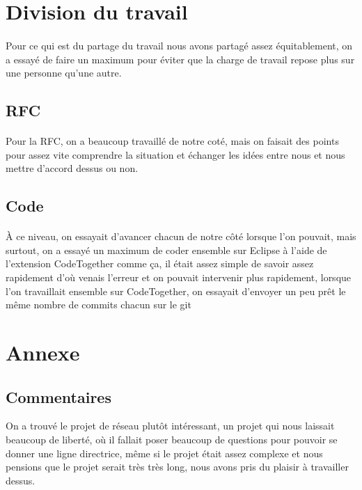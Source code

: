 \documentclass[a4paper,titlepage]{report}
\begin{document}
\section{Division du travail}
\paragraph{}
Pour ce qui est du partage du travail nous avons partagé assez équitablement, on a essayé de faire un maximum pour éviter que la charge de travail repose plus sur une personne qu'une autre.
\subsection{RFC}
\paragraph{}
Pour la RFC, on a beaucoup travaillé de notre coté, mais on faisait des points pour assez vite comprendre la situation et échanger les idées entre nous et nous mettre d'accord dessus ou non.
\subsection{Code}
\paragraph{}
À ce niveau, on essayait d'avancer chacun de notre côté lorsque l'on pouvait, mais surtout, on a essayé un maximum de coder ensemble sur Eclipse à l'aide de l'extension CodeTogether comme ça, il était assez simple de savoir assez rapidement d'où venais l'erreur et on pouvait intervenir plus rapidement, lorsque l'on travaillait ensemble sur CodeTogether, on essayait d'envoyer un peu prêt le même nombre de commits chacun sur le git
\section{Annexe}
\subsection{Commentaires}
On a trouvé le projet de réseau plutôt intéressant, un projet qui nous laissait beaucoup de liberté, où il fallait poser beaucoup de questions pour pouvoir se donner une ligne directrice, même si le projet était assez complexe et nous pensions que le projet serait très très long, nous avons pris du plaisir à travailler dessus.
\end{document}
